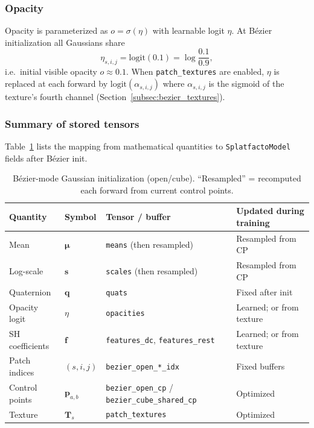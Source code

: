 \documentclass{report}
\newcommand{\code}[1]{\nolinkurl{#1}}
\begin{document}
\subsubsection{Opacity}
\label{subsubsec:init_opacity}

Opacity is parameterized as $o=\sigma(\eta)$ with learnable logit $\eta$. At B\'ezier initialization all Gaussians share
\begin{equation}
\eta_{s,i,j}=\mathrm{logit}(0.1)=\log\frac{0.1}{0.9},
\label{eq:init_opacity_logit}
\end{equation}
i.e.\ initial visible opacity $o\approx 0.1$. When \texttt{patch\_textures} are enabled, $\eta$ is replaced at each forward by $\mathrm{logit}(\alpha_{s,i,j})$ where $\alpha_{s,i,j}$ is the sigmoid of the texture's fourth channel (Section~\ref{subsec:bezier_textures}).

\subsubsection{Summary of stored tensors}
\label{subsubsec:init_summary}

Table~\ref{tab:gaussian_init_bezier} lists the mapping from mathematical quantities to \code{SplatfactoModel} fields after B\'ezier init.

\begin{table}[htbp]
\centering
\footnotesize
\caption{B\'ezier-mode Gaussian initialization (open/cube). ``Resampled'' = recomputed each forward from current control points.}
\label{tab:gaussian_init_bezier}
\begin{tabularx}{\linewidth}{@{}l l >{\raggedright\arraybackslash}X >{\raggedright\arraybackslash}X@{}}
\toprule
Quantity & Symbol & Tensor / buffer & Updated during training \\
\midrule
Mean & $\boldsymbol{\mu}$ & \code{means} (then resampled) & Resampled from CP \\
Log-scale & $\mathbf{s}$ & \code{scales} (then resampled) & Resampled from CP \\
Quaternion & $\mathbf{q}$ & \code{quats} & Fixed after init \\
Opacity logit & $\eta$ & \code{opacities} & Learned; or from texture \\
SH coefficients & $\mathbf{f}$ & \code{features\_dc}, \code{features\_rest} & Learned; or from texture \\
Patch indices & $(s,i,j)$ & \code{bezier\_open\_*\_idx} & Fixed buffers \\
Control points & $\mathbf{p}_{a,b}$ & \code{bezier\_open\_cp} / \code{bezier\_cube\_shared\_cp} & Optimized \\
Texture & $\mathbf{T}_s$ & \code{patch\_textures} & Optimized \\
\bottomrule
\end{tabularx}
\end{table}
\end{document}
